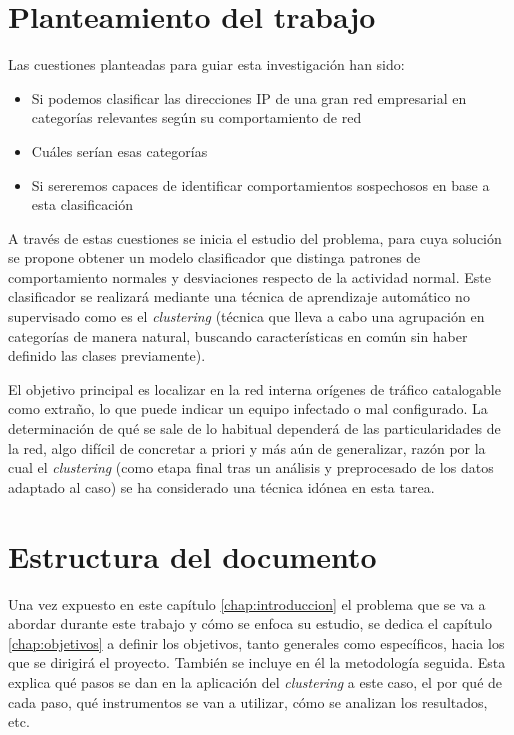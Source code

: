 \section{Planteamiento del trabajo}\label{sec:objetivos}

Las cuestiones planteadas para guiar esta investigación han sido:
\begin{itemize}
    \item Si podemos clasificar las direcciones IP de una gran red empresarial en categorías relevantes según su comportamiento de red
    \item Cuáles serían esas categorías
    \item Si sereremos capaces de identificar comportamientos sospechosos en base a esta clasificación
\end{itemize}

A través de estas cuestiones se inicia el estudio del problema, para cuya solución se propone obtener un modelo clasificador que distinga patrones de comportamiento normales y desviaciones respecto de la actividad normal.
Este clasificador se realizará mediante una técnica de aprendizaje automático no supervisado como es el \emph{clustering} (técnica que lleva a cabo una agrupación en categorías de manera natural, buscando características en común sin haber definido las clases previamente).

El objetivo principal es localizar en la red interna orígenes de tráfico catalogable como extraño, lo que puede indicar un equipo infectado o mal configurado.
La determinación de qué se sale de lo habitual dependerá de las particularidades de la red, algo difícil de concretar a priori y más aún de generalizar,
razón por la cual el \emph{clustering} (como etapa final tras un análisis y preprocesado de los datos adaptado al caso) se ha considerado una técnica idónea en esta tarea.

\section{Estructura del documento}\label{sec:estructura}

Una vez expuesto en este capítulo \ref{chap:introduccion} el problema que se va a abordar durante este trabajo y cómo se enfoca su estudio,
se dedica el capítulo \ref{chap:objetivos} a definir los objetivos, tanto generales como específicos, hacia los que se dirigirá el proyecto.
También se incluye en él la metodología seguida.
Esta explica qué pasos se dan en la aplicación del \emph{clustering} a este caso, el por qué de cada paso, qué instrumentos se van a utilizar, cómo se analizan los resultados, etc.

